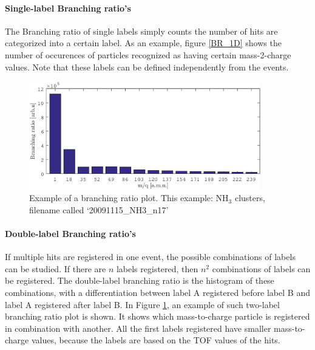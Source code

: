 \paragraph{Single-label Branching ratio's}

The Branching ratio of single labels simply counts the number of hits are categorized into a certain label. As an example, figure \ref{BR_1D} shows the number of occurences of particles recognized as having certain mass-2-charge values. Note that these labels can be defined independently from the events.

\begin{figure}[H]
   \centering
    \centerline{\includegraphics[width=0.9\textwidth]{Graphics/BR_1D.eps}}
\caption{Example of a branching ratio plot. This example: NH$_3$ clusters, filename called `20091115\_NH3\_n17'}
\label{BR_2D}
\end{figure}

\paragraph{Double-label Branching ratio's}
If multiple hits are registered in one event, the possible combinations of labels can be studied. If there are $n$ labels registered, then $n^2$ combinations of labels can be registered. The double-label branching ratio is the histogram of these combinations, with a differentiation between label A registered before label B and label A registered after label B. In Figure \ref{BR_2D}, an example of such two-label branching ratio plot is shown. It shows which mass-to-charge particle is registered in combination with another. All the first labels registered have smaller mass-to-charge values, because the labels are based on the TOF values of the hits.

